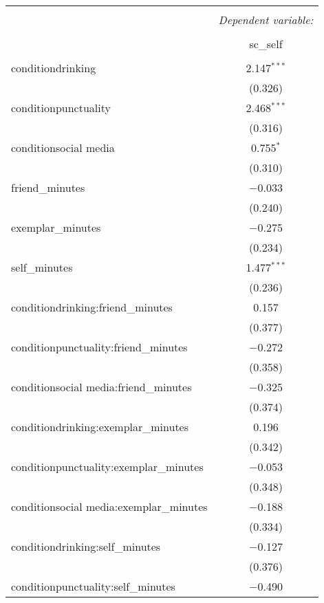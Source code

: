 
\begin{table}[!htbp] \centering 
  \caption{} 
  \label{} 
\begin{tabular}{@{\extracolsep{5pt}}lc} 
\\[-1.8ex]\hline 
\hline \\[-1.8ex] 
 & \multicolumn{1}{c}{\textit{Dependent variable:}} \\ 
\cline{2-2} 
\\[-1.8ex] & sc\_self \\ 
\hline \\[-1.8ex] 
 conditiondrinking & 2.147$^{***}$ \\ 
  & (0.326) \\ 
  conditionpunctuality & 2.468$^{***}$ \\ 
  & (0.316) \\ 
  conditionsocial media & 0.755$^{*}$ \\ 
  & (0.310) \\ 
  friend\_minutes & $-$0.033 \\ 
  & (0.240) \\ 
  exemplar\_minutes & $-$0.275 \\ 
  & (0.234) \\ 
  self\_minutes & 1.477$^{***}$ \\ 
  & (0.236) \\ 
  conditiondrinking:friend\_minutes & 0.157 \\ 
  & (0.377) \\ 
  conditionpunctuality:friend\_minutes & $-$0.272 \\ 
  & (0.358) \\ 
  conditionsocial media:friend\_minutes & $-$0.325 \\ 
  & (0.374) \\ 
  conditiondrinking:exemplar\_minutes & 0.196 \\ 
  & (0.342) \\ 
  conditionpunctuality:exemplar\_minutes & $-$0.053 \\ 
  & (0.348) \\ 
  conditionsocial media:exemplar\_minutes & $-$0.188 \\ 
  & (0.334) \\ 
  conditiondrinking:self\_minutes & $-$0.127 \\ 
  & (0.376) \\ 
  conditionpunctuality:self\_minutes & $-$0.490 \\ 

\end{tabular}
\end{table}
